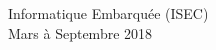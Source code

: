 \begin{titlepage}

{\large Informatique Embarquée (ISEC)}\\[10pt]


{\large Mars à Septembre 2018}\\[2cm] %


 

\vfill %

\end{titlepage}
